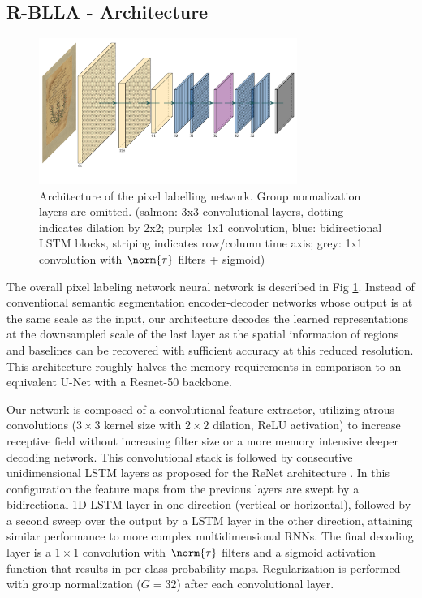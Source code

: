 \subsection{R-BLLA - Architecture}

\begin{figure}[ht]
        \centering
        \includegraphics[width=0.75\textwidth]{rblla}
	\caption{Architecture of the pixel labelling network. Group
	normalization layers are omitted. (salmon: 3x3 convolutional layers,
	dotting indicates dilation by 2x2; purple: 1x1 convolution, blue:
	bidirectional LSTM blocks, striping indicates row/column time axis;
	grey: 1x1 convolution with $\norm{\tau}$ filters + sigmoid)}
	\label{fig:rblla}
\end{figure}

The overall pixel labeling network neural network is described in Fig
\ref{fig:rblla}. Instead of conventional semantic segmentation encoder-decoder
networks whose output is at the same scale as the input, our architecture
decodes the learned representations at the downsampled scale of the last layer
as the spatial information of regions and baselines can be recovered with
sufficient accuracy at this reduced resolution. This architecture roughly
halves the memory requirements in comparison to an equivalent U-Net with a
Resnet-50 backbone.

Our network is composed of a convolutional feature extractor, utilizing atrous
convolutions ($3 \times 3$ kernel size with $2 \times 2$ dilation, ReLU
activation) to increase receptive field without increasing filter size or a
more memory intensive deeper decoding network. This convolutional stack is
followed by consecutive unidimensional LSTM layers as proposed for the ReNet
architecture \cite{visin2015renet}. In this configuration the feature maps from
the previous layers are swept by a bidirectional 1D LSTM layer in one direction
(vertical or horizontal), followed by a second sweep over the output by a LSTM
layer in the other direction, attaining similar performance to more complex
multidimensional RNNs. The final decoding layer is a $1\times 1$ convolution
with $\norm{\tau}$ filters and a sigmoid activation function that results in
per class probability maps.  Regularization is performed with group
normalization ($G=32$) \cite{DBLP:journals/corr/abs-1803-08494} after each
convolutional layer.

